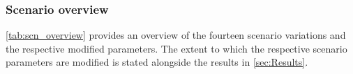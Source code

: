 \documentclass[article]{elsarticle}
\begin{document}

\subsubsection{Scenario overview}
\autoref{tab:scn_overview} provides an overview of the fourteen scenario variations and the respective modified parameters. The extent to which the respective scenario parameters are modified is stated alongside the results in \autoref{sec:Results}.
\end{document}
